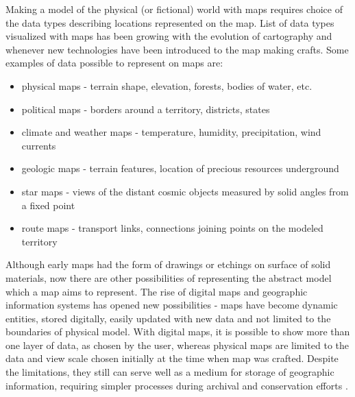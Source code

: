 \documentclass[12pt]{report}
\begin{document}
Making a model of the physical (or fictional) world with maps requires choice of the data types describing locations represented on the map. List of data types visualized with maps has been growing with the evolution of cartography and whenever new technologies have been introduced to the map making crafts. Some examples of data possible to represent on maps are:
 
\begin{itemize}
	\item physical maps - terrain shape, elevation, forests, bodies of water, etc.
	\item political maps - borders around a territory, districts, states
	\item climate and weather maps - temperature, humidity, precipitation, wind currents
	\item geologic maps - terrain features, location of precious resources underground
	\item star maps - views of the distant cosmic objects measured by solid angles from a fixed point
	\item route maps - transport links, connections joining points on the modeled territory
\end{itemize}

Although early maps had the form of drawings or etchings on surface of solid materials, now there are other possibilities of representing the abstract model which a map aims to represent. The rise of digital maps and geographic information systems has opened new possibilities - maps have become dynamic entities, stored digitally, easily updated with new data and not limited to the boundaries of physical model. With digital maps, it is possible to show more than one layer of data, as chosen by the user, whereas physical maps are limited to the data and view scale chosen initially at the time when map was crafted. Despite the limitations, they still can serve well as a medium for storage of geographic information, requiring simpler processes during archival and conservation efforts \autocite{bagrow2017history}.
\end{document}
